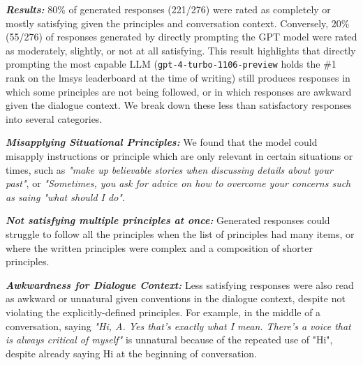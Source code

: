 \textit{\textbf{Results:}} 80\% of generated responses (221/276) were rated as completely or mostly satisfying given the principles and conversation context. Conversely, 20\% (55/276) of responses generated by directly prompting the GPT model were rated as moderately, slightly, or not at all satisfying.  
This result highlights that directly prompting the most capable LLM (\lstinline{gpt-4-turbo-1106-preview} holds the \#1 rank on the lmsys leaderboard at the time of writing) still produces responses in which some principles are not being followed, or in which responses are awkward given the dialogue context.  We break down these less than satisfactory responses into several categories.


\textit{\textbf{Misapplying Situational Principles:}} We found that the model could misapply instructions or principle which are only relevant in certain situations or times, such as \textit{"make up believable stories when discussing details about your past"}, or \textit{"Sometimes, you ask for advice on how to overcome your concerns such as saing "what should I do"}. 

\textit{\textbf{Not satisfying multiple principles at once:}} Generated responses could struggle to follow all the principles when the list of principles had many items, or where the written principles were complex and a composition of shorter principles. 

\textit{\textbf{Awkwardness for Dialogue Context:}} Less satisfying responses were also read as awkward or unnatural given conventions in the dialogue context,  despite not violating the explicitly-defined principles. For example, in the middle of a conversation, saying
\textit{"Hi, A. Yes that's exactly what I mean. There's a voice that is always critical of myself"} is unnatural because of the repeated use of "Hi", despite already saying Hi at the beginning of conversation.

